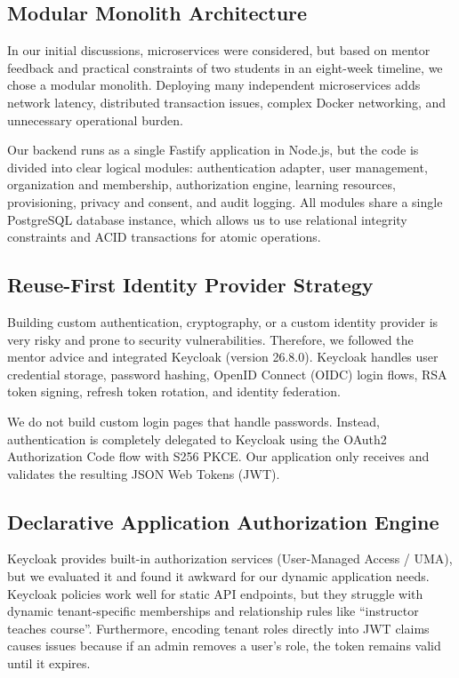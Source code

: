 \documentclass{article}
\begin{document}
\subsection*{Modular Monolith Architecture}
In our initial discussions, microservices were considered, but based on mentor feedback and practical constraints of two students in an eight-week timeline, we chose a modular monolith. Deploying many independent microservices adds network latency, distributed transaction issues, complex Docker networking, and unnecessary operational burden. 

Our backend runs as a single Fastify application in Node.js, but the code is divided into clear logical modules: authentication adapter, user management, organization and membership, authorization engine, learning resources, provisioning, privacy and consent, and audit logging. All modules share a single PostgreSQL database instance, which allows us to use relational integrity constraints and ACID transactions for atomic operations.

\subsection*{Reuse-First Identity Provider Strategy}
Building custom authentication, cryptography, or a custom identity provider is very risky and prone to security vulnerabilities. Therefore, we followed the mentor advice and integrated Keycloak (version 26.8.0). Keycloak handles user credential storage, password hashing, OpenID Connect (OIDC) login flows, RSA token signing, refresh token rotation, and identity federation. 

We do not build custom login pages that handle passwords. Instead, authentication is completely delegated to Keycloak using the OAuth2 Authorization Code flow with S256 PKCE. Our application only receives and validates the resulting JSON Web Tokens (JWT).

\subsection*{Declarative Application Authorization Engine}
Keycloak provides built-in authorization services (User-Managed Access / UMA), but we evaluated it and found it awkward for our dynamic application needs. Keycloak policies work well for static API endpoints, but they struggle with dynamic tenant-specific memberships and relationship rules like ``instructor teaches course''. Furthermore, encoding tenant roles directly into JWT claims causes issues because if an admin removes a user's role, the token remains valid until it expires.
\end{document}
